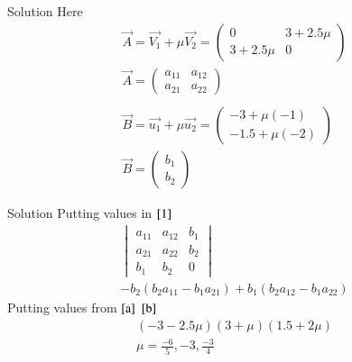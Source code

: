 \documentclass{beamer}
\begin{document}
\begin{frame}{Solution}
Here
\begin{align}
    \vec{A}=\vec{V_1}+\mu \vec{V_2}=\begin{pmatrix}0&3+2.5\mu\\3+2.5\mu&0\end{pmatrix} \label{a} \\
    \vec{A}=\begin{pmatrix}a_{11}&a_{12}\\a_{21}&a_{22}\end{pmatrix}\\ \\
    \vec{B}=\vec{u_1}+\mu \vec{u_2}=\begin{pmatrix}-3+\mu(-1)\\-1.5+\mu(-2)\end{pmatrix} \label{b}\\ \vec{B}=\begin{pmatrix}b_{1}\\b_{2}\end{pmatrix}
\end{align}
\end{frame}
\begin{frame}{Solution}
Putting values in $\eqref{1}$
\begin{align}
    \begin{vmatrix}a_{11}&a_{12}&b_1\\a_{21}&a_{22}&b_2\\b_1&b_2&0\end{vmatrix}\\
    -b_2(b_2a_{11}-b_1a_{21})+b_1(b_2a_{12}-b_1a_{22})
\end{align}
Putting values from $\eqref{a}$ $\eqref{b}$
\begin{align}
    (-3-2.5\mu)(3+\mu)(1.5+2\mu)\\
    \mu=\frac{-6}{5},-3,\frac{-3}{4}
\end{align}
\end{frame}
\end{document}
